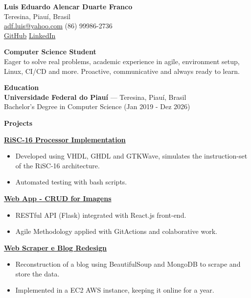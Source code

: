 \documentclass[a4paper,10pt]{article}
\newcommand{\heading}[1]{\noindent\textbf{\Large{#1}}}
\newcommand{\subheading}[1]{\noindent\textbf{\normalsize{#1}}} %
\begin{document}
\begin{center}
    {\huge \textbf{Luis Eduardo Alencar Duarte Franco}} \\
    Teresina, Piauí, Brasil \\
    \href{mailto:adf.luis@yahoo.com}{adf.luis@yahoo.com} \textbullet{} (86) 99986-2736 \\
    \href{https://github.com/seu-usuario}{GitHub} \textbullet{} \href{https://linkedin.com/in/seu-usuario}{LinkedIn}
\end{center}

\vspace{0.5cm}

\heading{Computer Science Student} \\ 
Eager to solve real problems, academic experience in agile, environment setup, Linux, CI/CD and more. Proactive, communicative and always ready to learn.

\vspace{0.5cm}

\heading{Education} \\
\textbf{Universidade Federal do Piauí} — Teresina, Piauí, Brasil \\
Bachelor's Degree in Computer Science (Jan 2019 - Dez 2026)

\vspace{0.5cm}

\heading{Projects}

\vspace{0.3cm}

\noindent
\subheading{\href{https://github.com/luisedu-adf/risc16}{RiSC-16 Processor Implementation}}  
\begin{itemize}[noitemsep]
    \item Developed using VHDL, GHDL and GTKWave, simulates the instruction-set of the RiSC-16 architecture. 
    \item Automated testing with bash scripts.
\end{itemize}


\noindent
\subheading{\href{https://github.com/es20231/eqp3}{Web App - CRUD for Imagens}}  
\begin{itemize}[noitemsep]
    \item RESTful API (Flask) integrated with React.js front-end.
	\item Agile Methodology applied with GitActions and colaborative work.
\end{itemize}


\noindent
\subheading{\href{https://github.com/luisedu-adf/chycho}{Web Scraper e Blog Redesign}}  
\begin{itemize}[noitemsep]
    \item Reconstruction of a blog using BeautifulSoup and MongoDB to scrape and store the data.
    \item Implemented in a EC2 AWS instance, keeping it online for a year.
\end{itemize}
\end{document}
